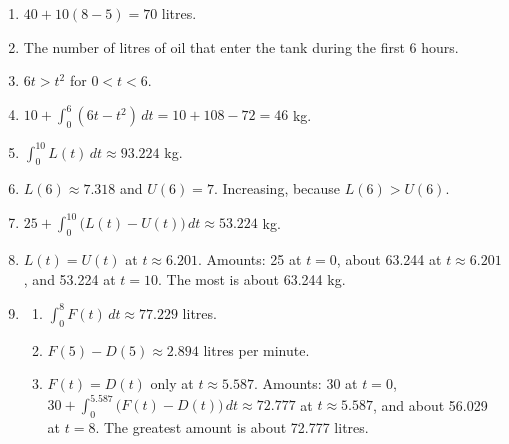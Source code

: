 \documentclass[11pt]{article}
\begin{document}
\newpage
\begin{solbox}
\begin{enumerate}[leftmargin=*,itemsep=4pt]
  \item $40+10(8-5)=70$ litres.
  \item The number of litres of oil that enter the tank during the first 6 hours.
  \item $6t>t^2$ for $0<t<6$.
  \item $10+\displaystyle\int_{0}^{6}(6t-t^2)\,dt=10+108-72=46$ kg.
  \item $\displaystyle\int_{0}^{10}L(t)\,dt\approx93.224$ kg.
  \item $L(6)\approx7.318$ and $U(6)=7$. Increasing, because $L(6)>U(6)$.
  \item $25+\displaystyle\int_{0}^{10}\big(L(t)-U(t)\big)\,dt\approx53.224$ kg.
  \item $L(t)=U(t)$ at $t\approx6.201$. Amounts: 25 at $t=0$, about 63.244 at $t\approx6.201$, and 53.224 at $t=10$. The most is about 63.244 kg.
  \item \begin{enumerate}[label=(\alph*),leftmargin=*,itemsep=3pt]
    \item $\displaystyle\int_{0}^{8}F(t)\,dt\approx77.229$ litres.
    \item $F(5)-D(5)\approx2.894$ litres per minute.
    \item $F(t)=D(t)$ only at $t\approx5.587$. Amounts: 30 at $t=0$, $30+\displaystyle\int_{0}^{5.587}\big(F(t)-D(t)\big)\,dt\approx72.777$ at $t\approx5.587$, and about 56.029 at $t=8$. The greatest amount is about 72.777 litres.
  \end{enumerate}
\end{enumerate}
\end{solbox}
\end{document}
